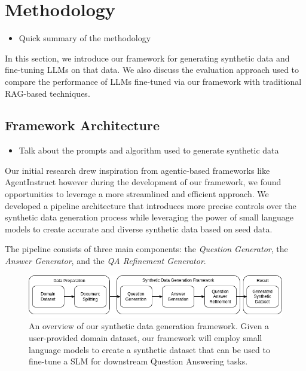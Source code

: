 \section{Methodology}

\begin{itemize}
  \item Quick summary of the methodology
\end{itemize}

In this section, we introduce our framework for generating synthetic data and fine-tuning LLMs on that data. 
We also discuss the evaluation approach used to compare the performance of LLMs fine-tuned via our framework 
with traditional RAG-based techniques.


\subsection{Framework Architecture}
\begin{itemize}
  \item Talk about the prompts and algorithm used to generate synthetic data
\end{itemize}

Our initial research drew inspiration from agentic-based frameworks like AgentInstruct %
however during the development of our framework, we found opportunities to leverage a more streamlined and efficient approach.
We developed a pipeline architecture that introduces more precise controls over the 
synthetic data generation process while leveraging the power of small language models to create accurate
and diverse synthetic data based on seed data.

The pipeline consists of three main components: the \textit{Question Generator}, the \textit{Answer Generator}, and the \textit{QA Refinement Generator}.

\begin{figure}[h]
  \centering
  \includegraphics[width=\textwidth]{methodology-overview.png}
  \caption{An overview of our synthetic data generation framework. Given a user-provided domain dataset, our
framework will employ small language models to create a synthetic dataset that can be used 
to fine-tune a SLM for downstream Question Answering tasks.}
\end{figure}

